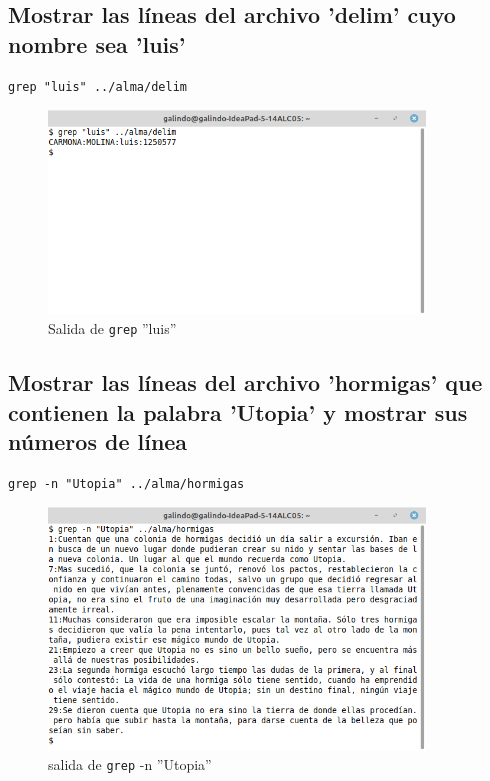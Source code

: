 \documentclass[11pt]{article}
\begin{document}
\pagebreak

\subsection{Mostrar las líneas del archivo 'delim' cuyo nombre sea 'luis'}
\label{sec:org90bbed8}
\begin{verbatim}
grep "luis" ../alma/delim
\end{verbatim}

\begin{figure}[htbp]
\centering
\includegraphics[width=10cm]{img/a28.png}
\caption[\texttt{grep}]{Salida de \texttt{grep} ''luis''}
\end{figure}

\subsection{Mostrar las líneas del archivo 'hormigas' que contienen la palabra 'Utopia' y mostrar sus números de línea}
\label{sec:orgfbb3ad3}
\begin{verbatim}
grep -n "Utopia" ../alma/hormigas
\end{verbatim}

\begin{figure}[htbp]
\centering
\includegraphics[width=10cm]{img/a29.png}
\caption[\texttt{grep}]{salida de \texttt{grep} -n ''Utopia''}
\end{figure}
\end{document}
